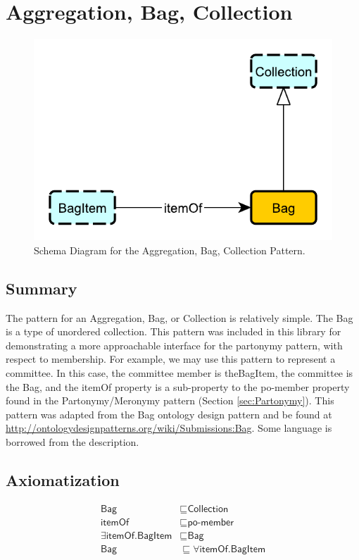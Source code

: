 \section{Aggregation, Bag, Collection}
\label{sec:Aggregation,}
\begin{figure}[h!]
\begin{center}
\includegraphics[width=.8\textwidth]{figures/aggregation}
\end{center}
\caption{Schema Diagram for the Aggregation, Bag, Collection Pattern.}
\label{fig:Aggregation,}
\end{figure}
\subsection{Summary}
\label{sum:Aggregation,}
The pattern for an Aggregation, Bag, or Collection is relatively simple. The Bag is a type of unordered collection. This pattern was included in this library for demonstrating a more approachable interface for the partonymy pattern, with respect to membership. For example, we may use this pattern to represent a committee. In this case, the committee member is the\textsf{BagItem}, the committee is the \textsf{Bag}, and the \textsf{itemOf} property is a sub-property to the \textsf{po-member} property found in the Partonymy/Meronymy pattern (Section \ref{sec:Partonymy}). This pattern was adapted from the Bag ontology design pattern and be found at \url{http://ontologydesignpatterns.org/wiki/Submissions:Bag}. Some language is borrowed from the description.

\subsection{Axiomatization}
\label{axs:Aggregation,}
\begin{align}
\textsf{Bag} &\sqsubseteq \textsf{Collection} \\
\textsf{itemOf} &\sqsubseteq \textsf{po-member} \\
\exists\textsf{itemOf.BagItem} &\sqsubseteq \textsf{Bag} \\
\textsf{Bag} &\sqsubseteq \forall\textsf{itemOf.BagItem} \\
\end{align}

